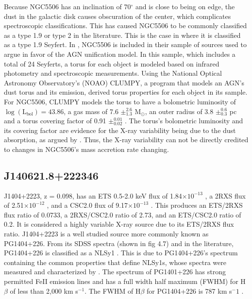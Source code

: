 
Because NGC5506 has an inclination of 70$^{\circ}$ and is close to being on edge, the dust in the galactic disk causes obscuration of the center, which complicates spectroscopic classifications. 
This has caused NGC5506 to be commonly classified as a type 1.9 or type 2 in the literature. 
This is the case in \cite{garcia2019} where it is classified as a type 1.9 Seyfert. 
In \cite{garcia2019}, NGC5506 is included in their sample of sources used to argue in favor of the AGN unification model. 
In this sample, which includes a total of 24 Seyferts, a torus for each object is modeled based on infrared photometry and spectroscopic measurements. 
Using the National Optical Astronomy Observatory’s (NOAO) CLUMPY, a program that models an AGN’s dust torus and its emission, \cite{garcia2019} derived torus properties for each object in its sample.
For NGC5506,  CLUMPY models the torus to have a bolometric luminosity of $\log(\text{L}_{\text{bol}}) = 43.86$,  a gas mass of 7.6 $\pm_{1.3}^{2.6}$ M$_{\odot}$, an outer radius of 3.8 $\pm_{0.3}^{0.6}$ pc and a torus covering factor of 0.91 $\pm_{0.02}^{0.01}$ \citep{garcia2019}. 
The torus’s bolometric luminosity and its covering factor are evidence for the X-ray variability being due to the dust absorption, as argued by \cite{nagar2002}.
Thus, the X-ray variability can not be directly credited to changes in NGC5506’s mass accretion rate changing.





\subsection{J140621.8+222346}


J1404+2223, z = 0.098, has an ETS 0.5-2.0 keV flux of 1.84$\times 10^{-13}$ \fluxunits, a 2RXS flux of 2.51$\times 10^{-12}$ \fluxunits, and a CSC2.0 flux of 9.17$\times 10^{-13}$ \fluxunits. 
This produces an ETS/2RXS flux ratio of 0.0733, a 2RXS/CSC2.0 ratio of 2.73, and an ETS/CSC2.0 ratio of 0.2. 
It is considered a highly variable X-ray source due to its ETS/2RXS flux ratio. 
J1404+2223 is a well studied source more commonly known as PG1404+226. 
From its SDSS spectra (shown in fig 4.7) and in the literature, PG1404+226 is classified as a NLSy1 \citep{mallick2018}. 
This is due to PG1404+226’s spectrum containing the common properties that define NLSy1s, whose spectra were measured and characterized by \cite{osterbrock1985}. 
The spectrum of PG1401+226 has strong permitted FeII emission lines and has a full width half maximum (FWHM) for H$\beta$ of less than 2,000 km s$^{-1}$. 
The FWHM of H$\beta$ for PG1404+226 is 787 km s${^-1}$ \citep{shangguan2018}.

